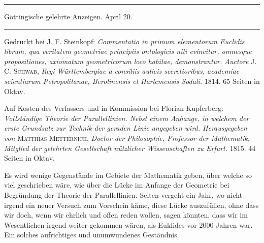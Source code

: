 \clearpage
{}\begin{center}
{\Large{}}
\end{center}

\bigskip
\hrule
\begin{center}
Göttingische gelehrte Anzeigen.  April 20.
\end{center}
\hrule

\bigskip
\begin{center}
{\large{}}
\end{center}

Gedruckt bei J. F. Steinkopf: \emph{Commentatio in primum elementorum Euclidis librum,
qua veritatem geometriae principiis ontologicis niti evincitur, omnesque
  propositiones, axiomatum geometricorum loco habitae, demonstrantur. Auctore}
  J. C. \textsc{Schwab}, \emph{Regi Württembergiae a consiliis aulicis
secretioribus, academiae scientiarum Petropolitanae, Berolinensis et Harlemensis
Sodali.} 1814. 65 Seiten in Oktav.

\begin{center}
{\large{}}
\end{center}

Auf Kosten des Verfassers und in Kommission bei Florian Kupferberg:
\emph{Vollständige Theorie der Parallellinien. Nebst einem Anhange, in welchem
der erste Grundsatz zur Technik der geraden Linie angegeben wird. Herausgegeben
von} \textsc{Matthias Metternich}, \emph{Doctor der Philosophie, Professor der
Mathematik, Mitglied der gelehrten Gesellschaft nützlicher Wissenschaften zu
Erfurt.} 1815. 44 Seiten in Oktav.

Es wird wenige Gegenstände im Gebiete der Mathematik geben, über welche so viel
geschrieben wäre, wie über die Lücke im Anfange der Geometrie bei Begründung der
Theorie der Parallellinien. Selten vergeht ein Jahr, wo nicht irgend ein neuer
Versuch zum Vorschein käme, diese Lücke auszufüllen, ohne dass wir doch, wenn wir
ehrlich und offen reden wollen, sagen könnten, dass wir im Wesentlichen irgend
weiter gekommen wären, als Euklides vor 2000 Jahren war. Ein solches
aufrichtiges und unumwundenes Geständnis
